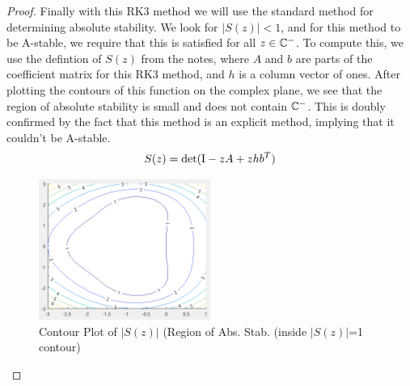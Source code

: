 \documentclass{article}
\begin{document}
\begin{enumerate}[label=\alph*)]
 \begin{proof}
    Finally with this RK3 method we will use the standard method for determining
    absolute stability. We look for $|S(z)| < 1$, and for this method to be
    A-stable, we require that this is satisfied for all $z \in \mathbb{C}^-$. To compute
    this, we use the defintion of $S(z)$ from the notes, where $A$ and $b$ are
    parts of the coefficient matrix for this RK3 method, and $h$ is a column
    vector of ones. After plotting the contours of this function on the complex
    plane, we see that the region of absolute stability is small and does not
    contain $\mathbb{C}^-$. This is doubly confirmed by the fact that this method is an
    explicit method, implying that it couldn't be A-stable. 
    \begin{align}
        S(z) = \det(\mathrm{I} - zA + zhb^T)
    \end{align}
    \begin{figure}[h]
        \centering
        \includegraphics[width=0.5\textwidth]{4cAbsStab.png}
        \caption{Contour Plot of $|S(z)|$ (Region of Abs. Stab. (inside
        $|S(z)|$=1 contour)}
    \end{figure}
   
 \end{proof}


\end{enumerate}
\end{document}
